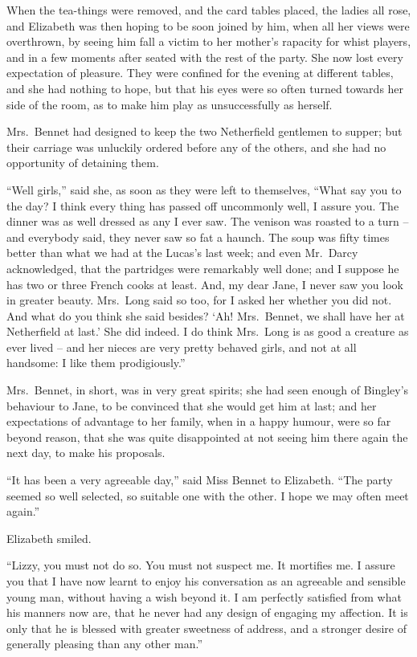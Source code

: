 When the tea-things were removed, and the card tables
placed, the ladies all rose, and Elizabeth was then hoping
to be soon joined by him, when all her views were overthrown,
by seeing him fall a victim to her mother’s rapacity
for whist players, and in a few moments after seated with
the rest of the party. She now lost every expectation of
pleasure. They were confined for the evening at different
tables, and she had nothing to hope, but that his eyes
were so often turned towards her side of the room, as to
make him play as unsuccessfully as herself.

Mrs.\ Bennet had designed to keep the two Netherfield
gentlemen to supper; but their carriage was unluckily
ordered before any of the others, and she had no opportunity
of detaining them.

“Well girls,” said she, as soon as they were left to
themselves, “What say you to the day? I think every
thing has passed off uncommonly well, I assure you. The
dinner was as well dressed as any I ever saw. The venison
was roasted to a turn -- and everybody said, they never
saw so fat a haunch. The soup was fifty times better
than what we had at the Lucas’s last week; and even
Mr.\ Darcy acknowledged, that the partridges were remarkably
well done; and I suppose he has two or three French
cooks at least. And, my dear Jane, I never saw you look
in greater beauty. Mrs.\ Long said so too, for I asked her
whether you did not. And what do you think she said
besides? ‘Ah! Mrs.\ Bennet, we shall have her at Netherfield
at last.’ She did indeed. I do think Mrs.\ Long is
as good a creature as ever lived -- and her nieces are very
pretty behaved girls, and not at all handsome: I like
them prodigiously.”

Mrs.\ Bennet, in short, was in very great spirits; she
had seen enough of Bingley’s behaviour to Jane, to be
convinced that she would get him at last; and her expectations
of advantage to her family, when in a happy
humour, were so far beyond reason, that she was quite
disappointed at not seeing him there again the next day,
to make his proposals.

“It has been a very agreeable day,” said Miss Bennet
to Elizabeth. “The party seemed so well selected, so
suitable one with the other. I hope we may often meet
again.”

Elizabeth smiled.

“Lizzy, you must not do so. You must not suspect
me. It mortifies me. I assure you that I have now learnt
to enjoy his conversation as an agreeable and sensible
young man, without having a wish beyond it. I am perfectly
satisfied from what his manners now are, that he never
had any design of engaging my affection. It is only that
he is blessed with greater sweetness of address, and a
stronger desire of generally pleasing than any other man.”

